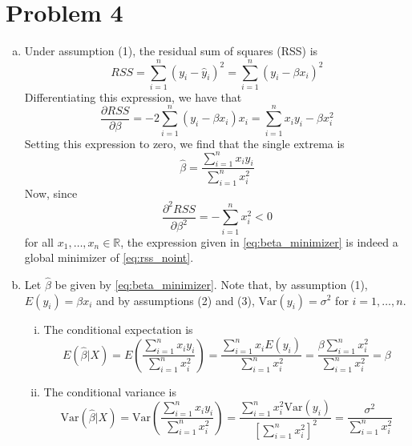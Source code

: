 \documentclass{amsart}
\newcommand{\var}{\textrm{Var}}
\begin{document}
    \section*{Problem 4}
    \begin{enumerate}[(a)]
        \item Under assumption (1), the residual sum of squares (RSS) is 
        \begin{equation}
            \label{eq:rss_noint}
            RSS = \sum_{i=1}^n (y_i - \hat{y}_i)^2 = \sum_{i=1}^n (y_i - \beta x_i)^2
        \end{equation}
        Differentiating this expression, we have that 
        \begin{equation*}
            \frac{\partial RSS}{\partial\beta} = -2\sum_{i=1}^n (y_i - \beta x_i)x_i = \sum_{i=1}^n x_iy_i - \beta x_i^2
        \end{equation*}
        Setting this expression to zero, we find that the single extrema is 
        \begin{equation}
            \label{eq:beta_minimizer}
            \hat\beta = \frac{\sum_{i=1}^n x_iy_i}{\sum_{i=1}^n x_i^2}
        \end{equation}
        Now, since 
        \begin{equation*}
            \frac{\partial^2 RSS}{\partial\beta^2} = -\sum_{i=1}^n x_i^2 < 0
        \end{equation*}
        for all $x_1, \ldots, x_n\in\mathbb R$, the expression given in \eqref{eq:beta_minimizer} is indeed a global minimizer of \eqref{eq:rss_noint}.
        \item Let $\hat\beta$ be given by \eqref{eq:beta_minimizer}. Note that, by assumption (1), $E(y_i) = \beta x_i$ and by assumptions (2) and (3), $\var(y_i) = \sigma^2$ for $i = 1, \ldots, n$. 
        \begin{enumerate}[(i)]
            \item The conditional expectation is 
            \begin{equation*}
                E(\hat\beta | X) = E\left(\frac{\sum_{i=1}^n x_iy_i}{\sum_{i=1}^n x_i^2}\right) = \frac{\sum_{i=1}^n x_iE(y_i)}{\sum_{i=1}^n x_i^2} = \frac{\beta\sum_{i=1}^n x_i^2}{\sum_{i=1}^n x_i^2} = \beta
            \end{equation*}
            \item The conditional variance is 
            \begin{equation*}
                \var(\hat\beta | X) = \var\left(\frac{\sum_{i=1}^n x_iy_i}{\sum_{i=1}^n x_i^2}\right) = \frac{\sum_{i=1}^n x_i^2\var(y_i)}{\left[\sum_{i=1}^n x_i^2\right]^2} = \frac{\sigma^2}{\sum_{i=1}^n x_i^2}

\end{equation*}
\end{enumerate}
\end{enumerate}
\end{document}
